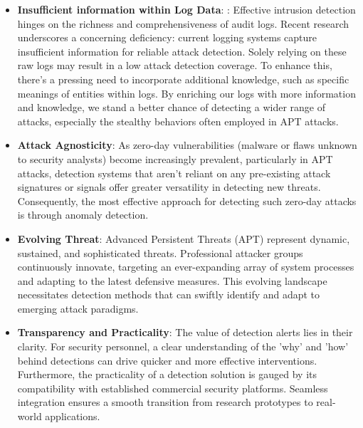 \begin{itemize}
    \item \textbf{Insufficient information within Log Data}: : Effective intrusion detection hinges on the richness and comprehensiveness of audit logs. Recent research \cite{gandhi2023rethinking} underscores a concerning deficiency: current logging systems capture insufficient information for reliable attack detection. Solely relying on these raw logs may result in a low attack detection coverage. To enhance this, there's a pressing need to incorporate additional knowledge, such as specific meanings of entities within logs. By enriching our logs with more information and knowledge, we stand a better chance of detecting a wider range of attacks, especially the stealthy behaviors often employed in APT attacks.
    \item \textbf{Attack Agnosticity}: 
    As zero-day vulnerabilities (malware or flaws unknown to security analysts) become increasingly prevalent, particularly in APT attacks, detection systems that aren't reliant on any pre-existing attack signatures or signals offer greater versatility in detecting new threats. Consequently, the most effective approach for detecting such zero-day attacks is through anomaly detection.
    \item \textbf{Evolving Threat}: Advanced Persistent Threats (APT) represent dynamic, sustained, and sophisticated threats. Professional attacker groups continuously innovate, targeting an ever-expanding array of system processes and adapting to the latest defensive measures. This evolving landscape necessitates detection methods that can swiftly identify and adapt to emerging attack paradigms.
    \item \textbf{Transparency and Practicality}: The value of detection alerts lies in their clarity. For security personnel, a clear understanding of the 'why' and 'how' behind detections can drive quicker and more effective interventions. Furthermore, the practicality of a detection solution is gauged by its compatibility with established commercial security platforms. Seamless integration ensures a smooth transition from research prototypes to real-world applications.
\end{itemize}

